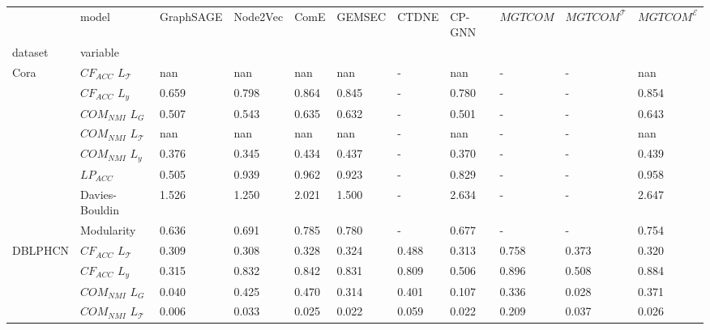 \begin{tabular}{lllllllllll}
\toprule
    & model & GraphSAGE & Node2Vec &   ComE & GEMSEC &  CTDNE &  CP-GNN & $MGTCOM$ & $MGTCOM^{\mathcal{T}}$ & $MGTCOM^{\mathcal{E}}$ \\
dataset & variable &           &          &        &        &        &         &          &                        &                        \\
\midrule
Cora & $CF_{ACC}$ $L_\mathcal{T}$ &       nan &      nan &    nan &    nan &      - &     nan &        - &                      - &                    nan \\
    & $CF_{ACC}$ $L_y$ &     0.659 &    0.798 &  0.864 &  0.845 &      - &   0.780 &        - &                      - &                  0.854 \\
    & $COM_{NMI}$ $L_G$ &     0.507 &    0.543 &  0.635 &  0.632 &      - &   0.501 &        - &                      - &                  0.643 \\
    & $COM_{NMI}$ $L_\mathcal{T}$ &       nan &      nan &    nan &    nan &      - &     nan &        - &                      - &                    nan \\
    & $COM_{NMI}$ $L_y$ &     0.376 &    0.345 &  0.434 &  0.437 &      - &   0.370 &        - &                      - &                  0.439 \\
    & $LP_{ACC}$ &     0.505 &    0.939 &  0.962 &  0.923 &      - &   0.829 &        - &                      - &                  0.958 \\
    & Davies-Bouldin &     1.526 &    1.250 &  2.021 &  1.500 &      - &   2.634 &        - &                      - &                  2.647 \\
    & Modularity &     0.636 &    0.691 &  0.785 &  0.780 &      - &   0.677 &        - &                      - &                  0.754 \\
DBLPHCN & $CF_{ACC}$ $L_\mathcal{T}$ &     0.309 &    0.308 &  0.328 &  0.324 &  0.488 &   0.313 &    0.758 &                  0.373 &                  0.320 \\
    & $CF_{ACC}$ $L_y$ &     0.315 &    0.832 &  0.842 &  0.831 &  0.809 &   0.506 &    0.896 &                  0.508 &                  0.884 \\
    & $COM_{NMI}$ $L_G$ &     0.040 &    0.425 &  0.470 &  0.314 &  0.401 &   0.107 &    0.336 &                  0.028 &                  0.371 \\
    & $COM_{NMI}$ $L_\mathcal{T}$ &     0.006 &    0.033 &  0.025 &  0.022 &  0.059 &   0.022 &    0.209 &                  0.037 &                  0.026 \\

\end{tabular}
